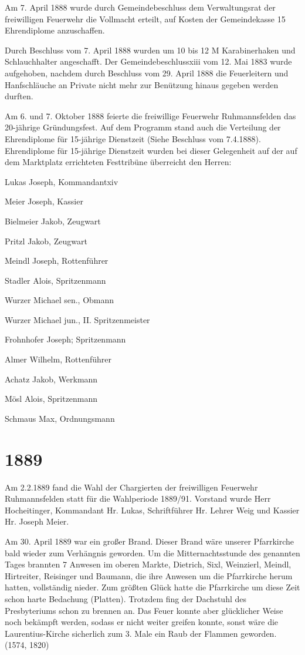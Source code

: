 \documentclass[12pt,a4paper]{book}
\begin{document}
Am 7. April 1888 wurde durch Gemeindebeschluss dem Verwaltungsrat der
freiwilligen Feuerwehr die Vollmacht erteilt, auf Kosten der Gemeindekasse 15
Ehrendiplome anzuschaffen.

Durch Beschluss vom 7. April 1888 wurden um 10 bis 12 M Karabinerhaken und
Schlauchhalter angeschafft. Der Gemeindebeschlussxiii vom 12. Mai 1883 wurde
aufgehoben, nachdem durch Beschluss vom 29. April 1888 die Feuerleitern und
Hanfschläuche an Private nicht mehr zur Benützung hinaus gegeben werden durften.

Am 6. und 7. Oktober 1888 feierte die freiwillige Feuerwehr Ruhmannsfelden das
20-jährige Gründungsfest. Auf dem Programm stand auch die Verteilung der
Ehrendiplome für 15-jährige Dienstzeit (Siehe Beschluss vom 7.4.1888).
Ehrendiplome für 15-jährige Dienstzeit wurden bei dieser Gelegenheit auf der auf
dem Marktplatz errichteten Festtribüne überreicht den Herren:

Lukas Joseph, Kommandantxiv

Meier Joseph, Kassier

Bielmeier Jakob, Zeugwart

Pritzl Jakob, Zeugwart

Meindl Joseph, Rottenführer

Stadler Alois, Spritzenmann

Wurzer Michael sen., Obmann

Wurzer Michael jun., II. Spritzenmeister

Frohnhofer Joseph; Spritzenmann

Almer Wilhelm, Rottenführer

Achatz Jakob, Werkmann

Mösl Alois, Spritzenmann

Schmaus Max, Ordnungsmann

\section*{1889}

Am 2.2.1889 fand die Wahl der Chargierten der freiwilligen Feuerwehr
Ruhmannsfelden statt für die Wahlperiode 1889/91. Vorstand wurde Herr
Hocheitinger, Kommandant Hr. Lukas, Schriftführer Hr. Lehrer Weig und Kassier
Hr. Joseph Meier.

Am 30. April 1889 war ein großer Brand. Dieser Brand wäre unserer Pfarrkirche
bald wieder zum Verhängnis geworden. Um die Mitternachtsstunde des genannten
Tages brannten 7 Anwesen im oberen Markte, Dietrich, Sixl, Weinzierl, Meindl,
Hirtreiter, Reisinger und Baumann, die ihre Anwesen um die Pfarrkirche herum
hatten, vollständig nieder. Zum größten Glück hatte die Pfarrkirche um diese
Zeit schon harte Bedachung (Platten). Trotzdem fing der Dachstuhl des
Presbyteriums schon zu brennen an. Das Feuer konnte aber glücklicher Weise noch
bekämpft werden, sodass er nicht weiter greifen konnte, sonst wäre die
Laurentius-Kirche sicherlich zum 3. Male ein Raub der Flammen geworden. (1574,
1820)
\end{document}
